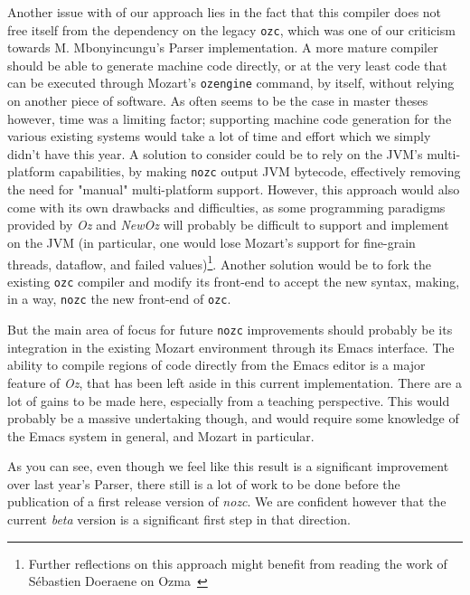 Another issue with of our approach lies in the fact that this compiler does not free itself from the dependency on the legacy \texttt{ozc}, which was one of our criticism towards M. Mbonyincungu's Parser implementation.
A more mature compiler should be able to generate machine code directly, or at the very least code that can be executed through Mozart's \texttt{ozengine} command, by itself, without relying on another piece of software.
As often seems to be the case in master theses however, time was a limiting factor;
supporting machine code generation for the various existing systems would take a lot of time and effort which we simply didn't have this year.
A solution to consider could be to rely on the JVM's multi-platform capabilities, by making \texttt{nozc} output JVM bytecode, effectively removing the need for  "manual" multi-platform support.
However, this approach would also come with its own drawbacks and difficulties, as some programming paradigms provided by \textit{Oz} and \textit{NewOz} will probably be difficult to support and implement on the JVM (in particular, one would lose Mozart's support for fine-grain threads, dataflow, and failed values)\footnote{Further reflections on this approach might benefit from reading the work of Sébastien Doeraene on Ozma~\cite{Ozma}}.
Another solution would be to fork the existing \texttt{ozc} compiler and modify its front-end to accept the new syntax, making, in a way, \texttt{nozc} the new front-end of \texttt{ozc}.\newline

But the main area of focus for future \texttt{nozc} improvements should probably be its integration in the existing Mozart environment through its Emacs interface.
The ability to compile regions of code directly from the Emacs editor is a major feature of \textit{Oz}, that has been left aside in this current implementation.
There are a lot of gains to be made here, especially from a teaching perspective.
This would probably be a massive undertaking though, and would require some knowledge of the Emacs system in general, and Mozart in particular.\newline

As you can see, even though we feel like this result is a significant improvement over last year's Parser, there still is a lot of work to be done before the publication of a first release version of \textit{nozc}.
We are confident however that the current \textit{beta} version is a significant first step in that direction.